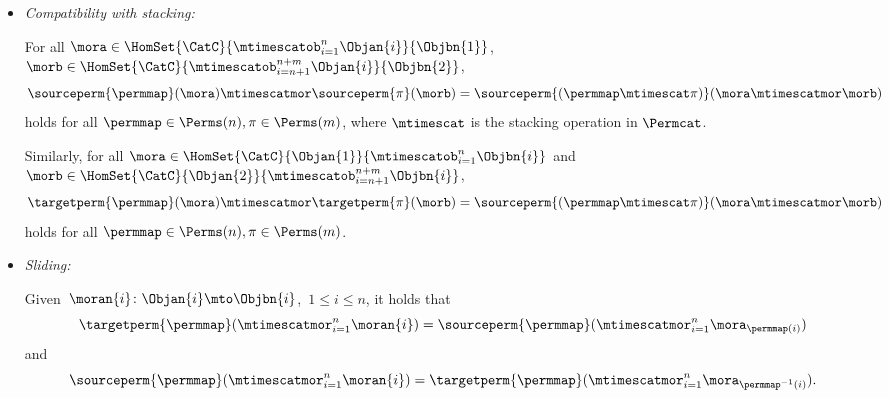 \begin{ctdefinition}
\begin{itemize}
        \item \emph{Compatibility with stacking:}

              For all $\mora \in \HomSet{\CatC}{\mtimescatob_{i=1}^n \Objan{i}}{\Objbn{1}}$, $\morb \in \HomSet{\CatC}{\mtimescatob_{i=n+1}^{n+m} \Objan{i}}{\Objbn{2}}$,
              \begin{equation}
                  \sourceperm{\permmap}(\mora) \mtimescatmor \sourceperm{\pi}(\morb) = \sourceperm{(\permmap \mtimescat \pi)}(\mora \mtimescatmor \morb)
              \end{equation}
              holds for all $\permmap \in \Perms(n), \pi \in \Perms(m)$, where $\mtimescat$ is the stacking operation in $\Permcat$.

              Similarly, for all $\mora \in \HomSet{\CatC}{\Objan{1}}{\mtimescatob_{i=1}^n \Objbn{i}} $ and $\morb \in \HomSet{\CatC}{\Objan{2}}{\mtimescatob_{i=n+1}^{n+m} \Objbn{i}}$,
              \begin{equation}
                  \targetperm{\permmap}(\mora) \mtimescatmor \targetperm{\pi}(\morb) = \sourceperm{(\permmap \mtimescat \pi)}(\mora \mtimescatmor \morb)
              \end{equation}
              holds for all $\permmap \in \Perms(n), \pi \in \Perms(m)$.

        \item \emph{Sliding:}

              Given~$\moran{i} \colon \Objan{i} \mto \Objbn{i}$,~$1 \leq i \leq n$, it holds that
              \begin{equation}
                  \label{eq:perm-compatibility-with-stacking-1}
                  \targetperm{\permmap} ( \mtimescatmor_{i=1}^n \moran{i} ) = \sourceperm{\permmap}( \mtimescatmor_{i=1}^n \mora_{\permmap(i)} )
              \end{equation}
              and
              \begin{equation}
                  \label{eq:perm-compatibility-with-stacking-2}
                  \sourceperm{\permmap} ( \mtimescatmor_{i=1}^n \moran{i} ) = \targetperm{\permmap} ( \mtimescatmor_{i=1}^n \mora_{\permmap^{-1}(i)} ).
              \end{equation}

    \end{itemize}
\end{ctdefinition}



